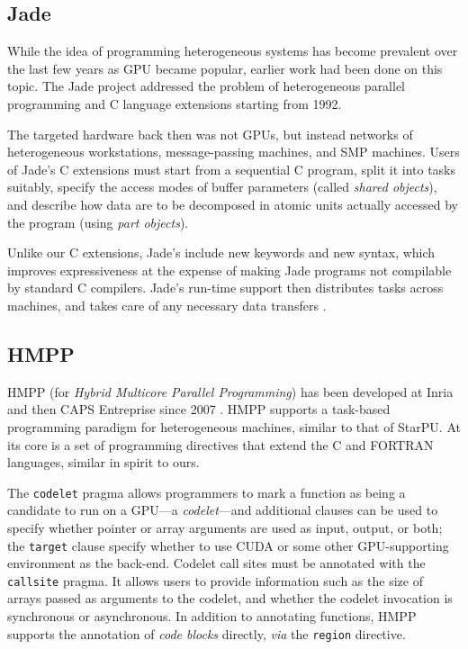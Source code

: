 \documentclass[twoside, a4paper, 10pt]{article}
\begin{document}
\subsection{Jade}
\label{sec-4-1}


While the idea of programming heterogeneous systems has become prevalent
over the last few years as GPU became popular, earlier work had been
done on this topic.  The Jade project
\cite{Rinard:1992:HPP:147877.148003,Rinard:1998:DIE:291889.291893}
addressed the problem of heterogeneous parallel programming and C
language extensions starting from 1992.

The targeted hardware back then was not GPUs, but instead networks of
heterogeneous workstations, message-passing machines, and SMP machines.
Users of Jade's C extensions must start from a sequential C program,
split it into tasks suitably, specify the access modes of buffer
parameters (called \emph{shared objects}), and describe how data are to be
decomposed in atomic units actually accessed by the program (using \emph{part objects}).

Unlike our C extensions, Jade's include new keywords and new syntax,
which improves expressiveness at the expense of making Jade programs not
compilable by standard C compilers.  Jade's run-time support then
distributes tasks across machines, and takes care of any necessary data
transfers \cite{Rinard:1992:HPP:147877.148003}.
\subsection{HMPP}
\label{sec-4-2}


HMPP (for \emph{Hybrid Multicore Parallel Programming}) has been developed at
Inria and then CAPS Entreprise since 2007 \cite{dolbeau07:hmpp}.  HMPP
supports a task-based programming paradigm for heterogeneous machines,
similar to that of StarPU.  At its core is a set of programming
directives that extend the C and FORTRAN languages, similar in spirit to
ours.

The \texttt{codelet} pragma allows programmers to mark a function as being a
candidate to run on a GPU---a \emph{codelet}---and additional clauses can be
used to specify whether pointer or array arguments are used as input,
output, or both; the \texttt{target} clause specify whether to use CUDA or some
other GPU-supporting environment as the back-end.  Codelet call sites
must be annotated with the \texttt{callsite} pragma.  It allows users to
provide information such as the size of arrays passed as arguments to
the codelet, and whether the codelet invocation is synchronous or
asynchronous.  In addition to annotating functions, HMPP supports the
annotation of \emph{code blocks} directly, \emph{via} the \texttt{region} directive.
\end{document}
